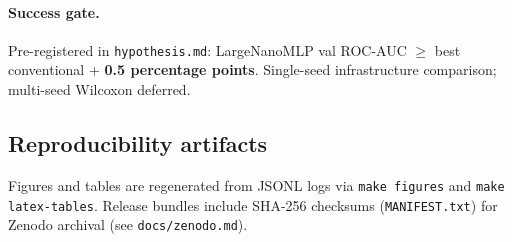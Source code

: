 \paragraph{Success gate.}
Pre-registered in \texttt{hypothesis.md}: LargeNanoMLP val ROC-AUC $\geq$ best
conventional + \textbf{0.5 percentage points}. Single-seed infrastructure comparison;
multi-seed Wilcoxon deferred.

\subsection{Reproducibility artifacts}

Figures and tables are regenerated from JSONL logs via \texttt{make figures} and
\texttt{make latex-tables}. Release bundles include SHA-256 checksums (\texttt{MANIFEST.txt})
for Zenodo archival (see \texttt{docs/zenodo.md}).
